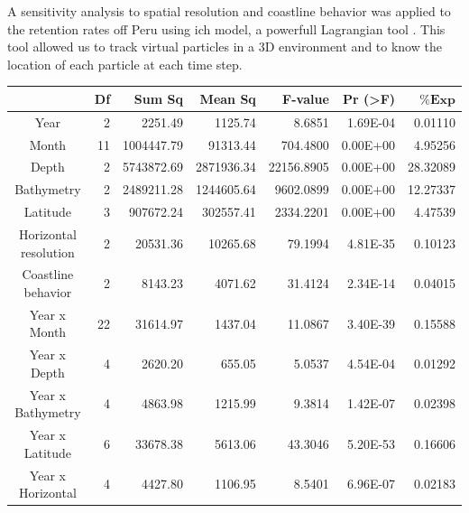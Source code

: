 A sensitivity analysis to spatial resolution and coastline behavior was applied to the retention rates off Peru using \gls{ich} model, a powerfull Lagrangian tool \citep{LettVerl2008}. This tool allowed us to track virtual particles in a 3D environment and to know the location of each particle at each time step.\\

\begin{table}[H]
\centering
\begin{adjustbox}{width=0.9\textwidth}
\small
\begin{tabular}{c|r|r|r|r|r|r}
\hline
                                  &
	\textbf{Df}                   &
	\textbf{Sum Sq}               &
	\textbf{Mean Sq}              &
	\textbf{F-value}    		   &
	\textbf{Pr (\textgreater{F})} &
	$\mathbf{\% Exp}$      \\
\hline
Year                             & 2     & 2251.49    & 1125.74    & 8.6851     & 1.69E-04  & 0.01110  \\
Month                            & 11    & 1004447.79 & 91313.44   & 704.4800   & 0.00E+00  & 4.95256  \\
Depth                            & 2  & 5743872.69 & 2871936.34 & 22156.8905 & 0.00E+00  & 28.32089 \\
Bathymetry                       & 2  & 2489211.28 & 1244605.64 & 9602.0899  & 0.00E+00  & 12.27337 \\
Latitude                         & 3  & 907672.24  & 302557.41  & 2334.2201  & 0.00E+00  & 4.47539  \\
Horizontal resolution            & 2  & 20531.36   & 10265.68   & 79.1994    & 4.81E-35  & 0.10123  \\
Coastline behavior               & 2  & 8143.23    & 4071.62    & 31.4124    & 2.34E-14  & 0.04015  \\
Year x Month                     & 22 & 31614.97   & 1437.04    & 11.0867    & 3.40E-39  & 0.15588  \\
Year x Depth                     & 4  & 2620.20    & 655.05     & 5.0537     & 4.54E-04  & 0.01292  \\
Year x Bathymetry                & 4  & 4863.98    & 1215.99    & 9.3814     & 1.42E-07  & 0.02398  \\
Year x Latitude                  & 6  & 33678.38   & 5613.06    & 43.3046    & 5.20E-53  & 0.16606  \\
Year x Horizontal                & 4  & 4427.80    & 1106.95    & 8.5401     & 6.96E-07  & 0.02183  \\

\end{tabular}
\end{adjustbox}
\end{table}

